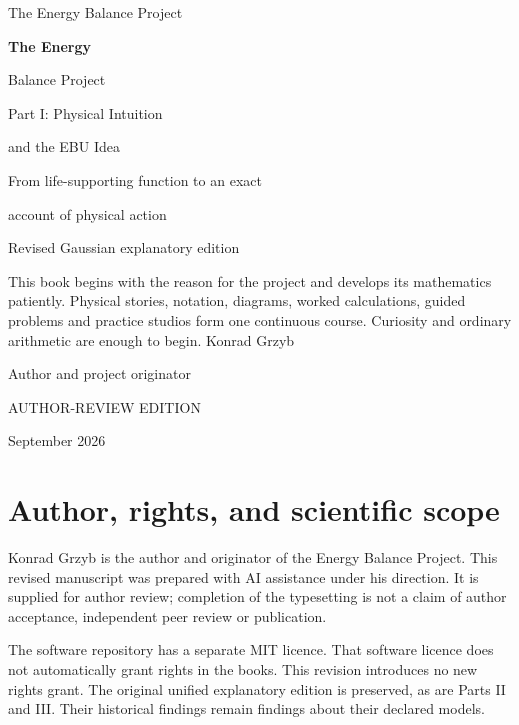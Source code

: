 \begin{titlepage}
\color{navy}\sffamily
\noindent\large The Energy Balance Project
\vspace{35pt}
\par\noindent\fontsize{29}{35}\selectfont\bfseries The Energy\par Balance Project
\vspace{20pt}
\par\noindent\fontsize{21}{27}\selectfont Part I: Physical Intuition\par and the EBU Idea
\vspace{20pt}
\par\noindent\large From life-supporting function to an exact\par account of physical action
\vspace{25pt}
\par\noindent\normalsize Revised Gaussian explanatory edition
\vspace{15pt}
\par\noindent\normalfont This book begins with the reason for the project and develops its mathematics patiently. Physical stories, notation, diagrams, worked calculations, guided problems and practice studios form one continuous course. Curiosity and ordinary arithmetic are enough to begin.
\vfill
\noindent\sffamily\Large Konrad Grzyb
\par\normalsize Author and project originator
\vspace{20pt}
\par\small AUTHOR-REVIEW EDITION\par September 2026
\end{titlepage}

\chapter*{Author, rights, and scientific scope}
Konrad Grzyb is the author and originator of the Energy Balance Project. This revised manuscript was prepared with AI assistance under his direction. It is supplied for author review; completion of the typesetting is not a claim of author acceptance, independent peer review or publication.

The software repository has a separate MIT licence. That software licence does not automatically grant rights in the books. This revision introduces no new rights grant. The original unified explanatory edition is preserved, as are Parts II and III. Their historical findings remain findings about their declared models.

